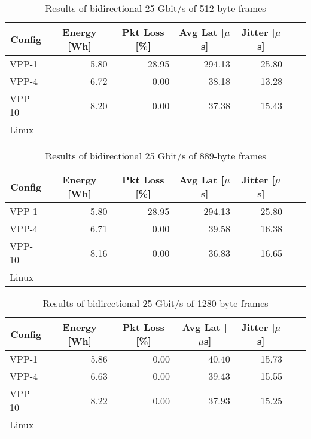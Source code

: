 \begin{table}[h!]
\centering
\caption{Results of bidirectional 25 Gbit/s of 512-byte frames}
\begin{tabular}{|l|r|r|r|r|r|r|}
\hline
\multicolumn{1}{|c|}{\textbf{Config}} &
\multicolumn{1}{c|}{\textbf{Energy [Wh] }} &
\multicolumn{1}{c|}{\textbf{Pkt Loss [\%]}} &
\multicolumn{1}{c|}{\textbf{Avg Lat [$\mu$s]}} &
\multicolumn{1}{c|}{\textbf{Jitter [$\mu$s]}} \\
\hline 
VPP-1 & 5.80 & 28.95 & 294.13 & 25.80 \\
VPP-4 & 6.72 & 0.00  & 38.18  & 13.28 \\
VPP-10 & 8.20 & 0.00 & 37.38  & 15.43 \\
Linux &  &  &  &  \\
\hline
\end{tabular}
\label{tab:25budp:512B}
\end{table}





\begin{table}[h!]
\centering
\caption{Results of bidirectional 25 Gbit/s of 889-byte frames}
\begin{tabular}{|l|r|r|r|r|r|r|}
\hline
\multicolumn{1}{|c|}{\textbf{Config}} &
\multicolumn{1}{c|}{\textbf{Energy [Wh] }} &
\multicolumn{1}{c|}{\textbf{Pkt Loss [\%]}} &
\multicolumn{1}{c|}{\textbf{Avg Lat [$\mu$s]}} &
\multicolumn{1}{c|}{\textbf{Jitter [$\mu$s]}} \\
\hline 
VPP-1 & 5.80 & 28.95 & 294.13 & 25.80 \\
VPP-4 & 6.71 & 0.00 & 39.58 & 16.38 \\
VPP-10 & 8.16 & 0.00 & 36.83 & 16.65 \\
Linux &  &  &  &  \\
\hline
\end{tabular}
\label{tab:25budp:889B}
\end{table}






\begin{table}[h!]
\centering
\caption{Results of bidirectional 25 Gbit/s of 1280-byte frames}
\begin{tabular}{|l|r|r|r|r|r|r|}
\hline
\multicolumn{1}{|c|}{\textbf{Config}} &
\multicolumn{1}{c|}{\textbf{Energy [Wh] }} &
\multicolumn{1}{c|}{\textbf{Pkt Loss [\%]}} &
\multicolumn{1}{c|}{\textbf{Avg Lat [$\mu$s]}} &
\multicolumn{1}{c|}{\textbf{Jitter [$\mu$s]}} \\
\hline 
VPP-1 & 5.86 & 0.00 & 40.40 & 15.73 \\
VPP-4 & 6.63 & 0.00 & 39.43 & 15.55 \\
VPP-10 & 8.22 & 0.00 & 37.93 & 15.25 \\
Linux &  &  &  &  \\
\hline
\end{tabular}
\label{tab:25budp:1280B}
\end{table}






